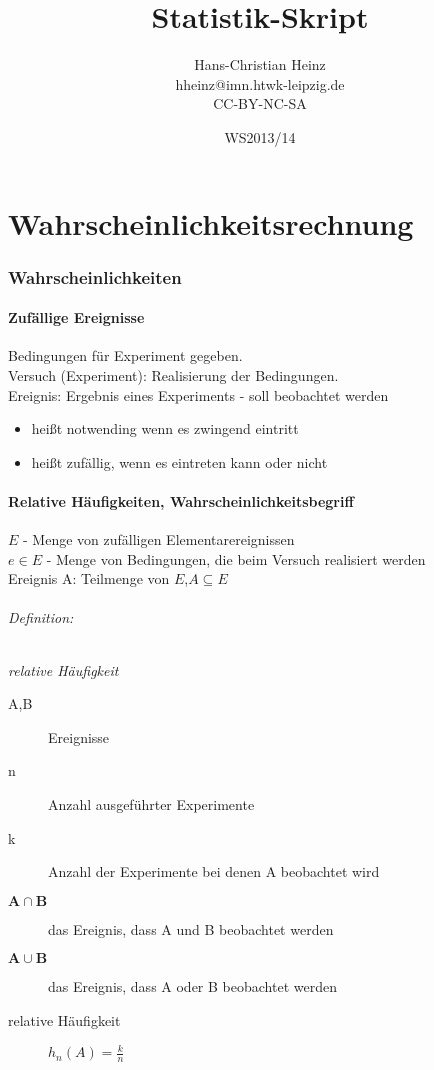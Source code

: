\documentclass[a4paper,12pt]{scrartcl}
\title{Statistik-Skript}
\author{Hans-Christian Heinz\\
hheinz@imn.htwk-leipzig.de\\
CC-BY-NC-SA}
\date{WS2013/14}
\begin{document}
\maketitle

\part{Wahrscheinlichkeitsrechnung}

\section{Wahrscheinlichkeiten}
\subsection{Zufällige Ereignisse}
Bedingungen für Experiment gegeben.\\
Versuch (Experiment): Realisierung der Bedingungen.\\
Ereignis: Ergebnis eines Experiments - soll beobachtet werden
\begin{itemize}
 \item heißt notwending wenn es zwingend eintritt
 \item heißt zufällig, wenn es eintreten kann oder nicht
\end{itemize}

\subsection{Relative Häufigkeiten, Wahrscheinlichkeitsbegriff}
$E$ - Menge von zufälligen Elementarereignissen\\
$e\in E$ - Menge von Bedingungen, die beim Versuch realisiert werden\\
Ereignis A: Teilmenge von $E$,$A\subseteq E$\\
\paragraph{Definition:} \textit{relative Häufigkeit}
\begin{description}
 \item[A,B] Ereignisse
 \item[n] Anzahl ausgeführter Experimente
 \item[k] Anzahl der Experimente bei denen A beobachtet wird
 \item[$\mathbf{A\cap B}$] das Ereignis, dass A und B beobachtet werden
 \item[$\mathbf{A\cup B}$] das Ereignis, dass A oder B beobachtet werden
 \item[relative Häufigkeit] $h_n(A) = \frac{k}{n}$
\end{description}
\end{document}
